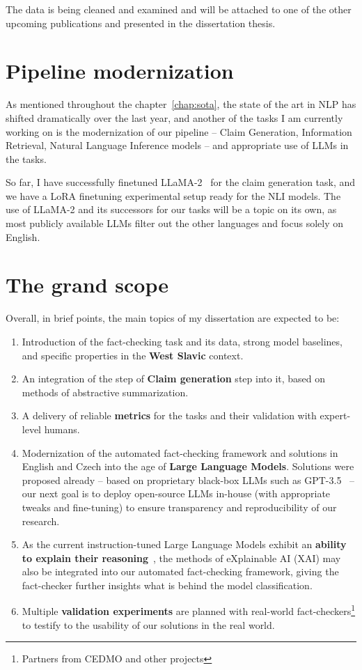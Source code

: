 The data is being cleaned and examined and will be attached to one of the other upcoming publications and presented in the dissertation thesis.

\section{Pipeline modernization}
As mentioned throughout the chapter~\ref{chap:sota}, the state of the art in NLP has shifted dramatically over the last year, and another of the tasks I am currently working on is the modernization of our pipeline -- Claim Generation, Information Retrieval, Natural Language Inference models -- and appropriate use of LLMs in the tasks.

So far, I have successfully finetuned LLaMA-2~\cite{llama2} for the claim generation task, and we have a LoRA finetuning experimental setup ready for the NLI models.
The use of LLaMA-2 and its successors for our tasks will be a topic on its own, as most publicly available LLMs filter out the other languages and focus solely on English.

\section{The grand scope}
Overall, in brief points, the main topics of my dissertation are expected to be:
\begin{enumerate}
    \item Introduction of the fact-checking task and its data, strong model baselines, and specific properties in the \textbf{West Slavic} context.
    \item An integration of the step of \textbf{Claim generation} step into it, based on methods of abstractive summarization.
    \item A delivery of reliable \textbf{metrics} for the tasks and their validation with expert-level humans.
    \item Modernization of the automated fact-checking framework and solutions in English and Czech into the age of \textbf{Large Language Models}.
    Solutions were proposed already -- based on proprietary black-box LLMs such as GPT-3.5~\cite{bing} -- our next goal is to deploy open-source LLMs in-house (with appropriate tweaks and fine-tuning) to ensure transparency and reproducibility of our research.
    \item As the current instruction-tuned Large Language Models exhibit an \textbf{ability to explain their reasoning}~\cite{SAEED2023110273}, the methods of eXplainable AI (XAI) may also be integrated into our automated fact-checking framework, giving the fact-checker further insights what is behind the model classification.
    \item Multiple \textbf{validation experiments} are planned with real-world fact-checkers\footnote{Partners from CEDMO and other projects} to testify to the usability of our solutions in the real world.
\end{enumerate}